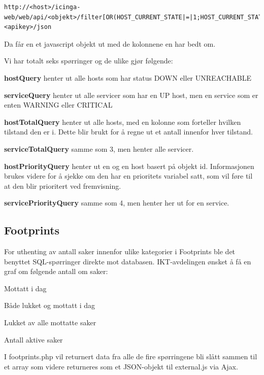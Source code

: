 \begin{lstlisting}[style=example]
http://<host>/icinga-web/web/api/<objekt>/filter[OR(HOST_CURRENT_STATE|=|1;HOST_CURRENT_STATE|=|2)]/columns[HOST_ID|HOST_CURRENT_CHECK_ATTEMPT|...]/authkey=<apikey>/json
\end{lstlisting}

Da får en et javascript objekt ut med de kolonnene en har bedt om.

Vi har totalt seks spørringer og de ulike gjør følgende:
\begin{enumerate*}\label{sporringer}
	\item  \textbf{hostQuery} henter ut alle hosts som har status DOWN eller UNREACHABLE
	\item  \textbf{serviceQuery} henter ut alle servicer som har en UP host, men en service som er enten WARNING eller CRITICAL
	\item  \textbf{hostTotalQuery} henter ut alle hosts, med en kolonne som forteller hvilken tilstand den er i. Dette blir brukt for å regne ut et antall innenfor hver tilstand.
	\item  \textbf{serviceTotalQuery} samme som 3, men henter alle servicer.
	\item  \textbf{hostPriorityQuery} henter ut en og en host basert på objekt id. Informasjonen brukes videre for å sjekke om den har en prioritets variabel satt, som vil føre til at den blir prioritert ved fremvisning.
	\item  \textbf{servicePriorityQuery} samme som 4, men henter her ut for en service.
\end{enumerate*}

\subsection{Footprints}

For uthenting av antall saker innenfor ulike kategorier i Footprints ble det benyttet SQL-spørringer direkte mot databasen. IKT-avdelingen ønsket å få en graf om følgende antall om saker:
\begin{itemize*}
	\item Mottatt i dag
	\item Både lukket og mottatt i dag
	\item Lukket av alle mottatte saker
	\item Antall aktive saker
\end{itemize*}

I footprints.php vil returnert data fra alle de fire spørringene bli slått sammen til et array som videre returneres som et JSON-objekt til external.js via Ajax. 

